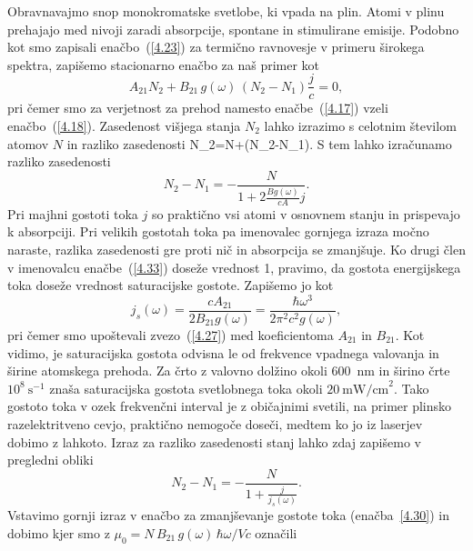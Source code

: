 Obravnavajmo snop monokromatske svetlobe, ki vpada na plin. 
Atomi v plinu prehajajo med nivoji zaradi absorpcije, spontane in stimulirane emisije. 
Podobno kot smo zapisali enačbo~(\ref{4.23}) za termično ravnovesje v primeru
širokega spektra, zapišemo stacionarno enačbo za naš primer kot
\begin{equation}
A_{21}N_{2}+B_{21}\,g(\omega)\,(N_{2}-N_{1})\frac{j}{c}=0,
\label{4.32}
\end{equation}
pri čemer smo za verjetnost za prehod namesto enačbe~(\ref{4.17}) vzeli
enačbo~(\ref{4.18}). Zasedenost višjega stanja $N_{2}$ lahko izrazimo s 
celotnim številom atomov $N$ in razliko zasedenosti 
\beq
N_{2}=N+(N_{2}-N_{1}).
\label{4.321}
\eeq
S tem lahko izračunamo razliko zasedenosti 
\begin{equation}
N_{2}-N_{1}=-\frac{N}{1+2\frac{Bg(\omega)}{cA}j}.
\label{4.33}
\end{equation}
Pri majhni gostoti toka $j$ so praktično vsi atomi v osnovnem stanju in prispevajo
k absorpciji. Pri velikih gostotah toka pa imenovalec gornjega
izraza močno naraste, razlika zasedenosti gre proti nič in absorpcija se zmanjšuje.
Ko drugi člen v imenovalcu enačbe~(\ref{4.33}) doseže vrednost 1, pravimo, da
gostota energijskega toka doseže vrednost saturacijske gostote.
Zapišemo jo kot 
\begin{equation}
j_{s}(\omega)=\frac{cA_{21}}{2B_{21}g(\omega)}=
\frac{\hbar\omega^{3}}{2\pi^{2}c^{2}g(\omega)},
\label{4.34}
\end{equation}
pri čemer smo upoštevali zvezo~(\ref{4.27}) med koeficientoma $A_{21}$ in $B_{21}$.
Kot vidimo, je saturacijska gostota odvisna le od frekvence vpadnega valovanja 
in širine atomskega prehoda. Za črto z valovno dolžino okoli 600~nm in širino črte
$10^{8}~\mathrm{s}^{-1}$ znaša saturacijska gostota svetlobnega toka okoli 
$20~\mathrm{mW/cm}^{2}$. Tako gostoto toka v ozek frekvenčni interval
je z običajnimi svetili, na primer plinsko razelektritveno cevjo,
praktično nemogoče doseči, medtem ko jo iz laserjev dobimo z lahkoto.
Izraz za razliko zasedenosti stanj lahko zdaj zapišemo v pregledni obliki
\begin{equation}
N_{2}-N_{1}=-\frac{N}{1+\frac{j}{j_{s}(\omega)}}.
\label{4.35}
\end{equation}
Vstavimo gornji izraz v enačbo za zmanjševanje gostote toka (enačba~\ref{4.30}) in 
dobimo 
kjer smo z $\mu_{0}=N\,B_{21}\,g(\omega)\,\hbar\omega/Vc$ označili
